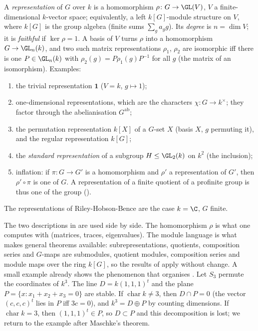 \begin{definition}[Representations]\label{def:reps:representation}
A \emph{representation} of $G$ over $k$ is a homomorphism $\rho\colon G\to\GL(V)$, $V$ a finite-dimensional $k$-vector space; equivalently, a
left $k[G]$-module structure on $V$, where $k[G]$ is the group algebra (finite sums $\sum_ga_gg$). Its \emph{degree} is $n=\dim V$; it is
\emph{faithful} if $\ker\rho=1$. A basis of $V$ turns $\rho$ into a homomorphism $G\to\GL_n(k)$, and two such matrix representations $\rho_1$,
$\rho_2$ are isomorphic iff there is one $P\in\GL_n(k)$ with $\rho_2(g)=P\rho_1(g)P^{-1}$ for all $g$ (the matrix of an isomorphism).
Examples:
\begin{enumerate}[label=(\alph*)]
\item the trivial representation $\mathbf 1$ ($V=k$, $g\mapsto1$);
\item one-dimensional representations, which are the characters $\chi\colon G\to k^\times$; they factor through the abelianisation $G^{\mathrm{ab}}$;
\item the permutation representation $k[X]$ of a $G$-set $X$ (basis $X$, $g$ permuting it), and the regular representation $k[G]$;
\item the \emph{standard representation} of a subgroup $H\le\GL_2(k)$ on $k^2$ (the inclusion);
\item inflation: if $\pi\colon G\to G'$ is a homomorphism and $\rho'$ a representation of $G'$, then $\rho'\circ\pi$ is one of $G$. A representation
of a finite quotient of a profinite group is thus one of the group ().
\end{enumerate}
The representations of Riley-Hobson-Bence \cite{RHB06} are the case $k=\C$, $G$ finite.
\end{definition}

The two descriptions in  are used side by side. The homomorphism $\rho$ is what one computes with
(matrices, traces, eigenvalues). The module language is what makes general theorems available: subrepresentations, quotients,
composition series and $G$-maps are submodules, quotient modules, composition series and module maps over the ring $k[G]$, so the
results of  apply without change. A small example already shows the phenomenon that organises
. Let $S_3$ permute the coordinates of $k^3$. The line $D=k(1,1,1)^t$ and the plane $P=\{x:x_1+x_2+x_3=0\}$ are
stable. If $\operatorname{char}k\ne3$, then $D\cap P=0$ (the vector $(c,c,c)^t$ lies in $P$ iff $3c=0$), and $k^3=D\oplus P$ by counting
dimensions. If $\operatorname{char}k=3$, then $(1,1,1)^t\in P$, so $D\subset P$ and this decomposition is lost; we return to the example
after Maschke's theorem.

